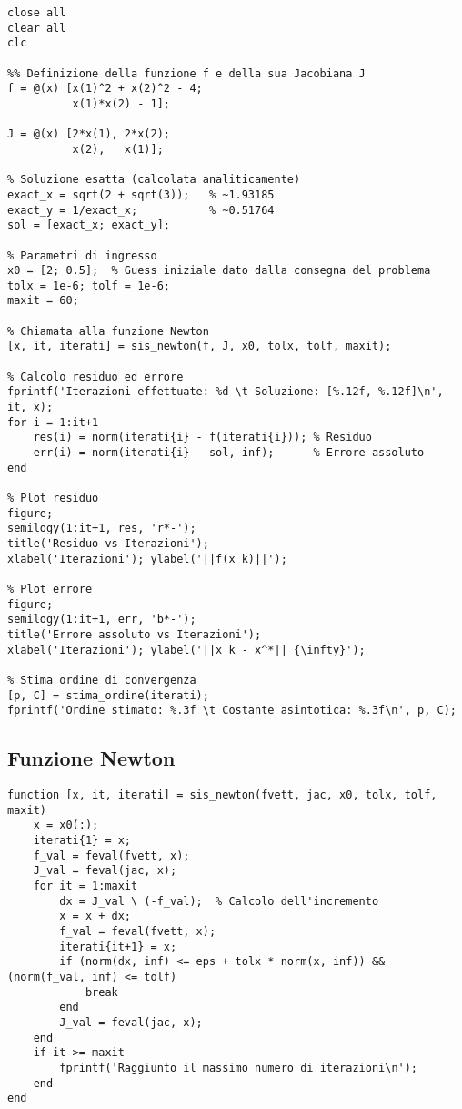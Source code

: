 \documentclass[11pt]{article}
\begin{document}
\begin{lstlisting}
close all
clear all
clc

%% Definizione della funzione f e della sua Jacobiana J
f = @(x) [x(1)^2 + x(2)^2 - 4;
          x(1)*x(2) - 1];

J = @(x) [2*x(1), 2*x(2);
          x(2),   x(1)];

% Soluzione esatta (calcolata analiticamente)
exact_x = sqrt(2 + sqrt(3));   % ~1.93185
exact_y = 1/exact_x;           % ~0.51764
sol = [exact_x; exact_y];

% Parametri di ingresso
x0 = [2; 0.5];  % Guess iniziale dato dalla consegna del problema
tolx = 1e-6; tolf = 1e-6;
maxit = 60;

% Chiamata alla funzione Newton
[x, it, iterati] = sis_newton(f, J, x0, tolx, tolf, maxit);

% Calcolo residuo ed errore
fprintf('Iterazioni effettuate: %d \t Soluzione: [%.12f, %.12f]\n', it, x);
for i = 1:it+1
    res(i) = norm(iterati{i} - f(iterati{i})); % Residuo
    err(i) = norm(iterati{i} - sol, inf);      % Errore assoluto
end

% Plot residuo
figure;
semilogy(1:it+1, res, 'r*-');
title('Residuo vs Iterazioni');
xlabel('Iterazioni'); ylabel('||f(x_k)||');

% Plot errore
figure;
semilogy(1:it+1, err, 'b*-');
title('Errore assoluto vs Iterazioni');
xlabel('Iterazioni'); ylabel('||x_k - x^*||_{\infty}');

% Stima ordine di convergenza
[p, C] = stima_ordine(iterati); 
fprintf('Ordine stimato: %.3f \t Costante asintotica: %.3f\n', p, C);
\end{lstlisting}

\subsection*{Funzione Newton}

\begin{lstlisting}
function [x, it, iterati] = sis_newton(fvett, jac, x0, tolx, tolf, maxit)
    x = x0(:);
    iterati{1} = x;
    f_val = feval(fvett, x);
    J_val = feval(jac, x);
    for it = 1:maxit
        dx = J_val \ (-f_val);  % Calcolo dell'incremento
        x = x + dx;
        f_val = feval(fvett, x);
        iterati{it+1} = x;
        if (norm(dx, inf) <= eps + tolx * norm(x, inf)) && (norm(f_val, inf) <= tolf)
            break
        end
        J_val = feval(jac, x);
    end
    if it >= maxit
        fprintf('Raggiunto il massimo numero di iterazioni\n');
    end
end
\end{lstlisting}
\end{document}
